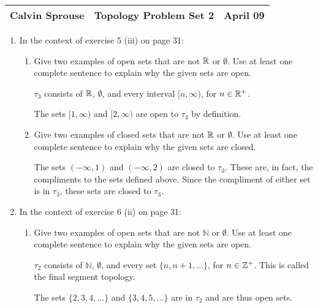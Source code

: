 \documentclass[a4paper, 12pt]{config/homework}
\begin{document}
\noindent
\begin{tabularx}{\textwidth}{>{\centering\arraybackslash}X>{\centering\arraybackslash}X>{\centering\arraybackslash}X}
Calvin Sprouse & Topology Problem Set 2 & 2024 April 09\\
\midrule
\end{tabularx}

\vspace{\baselineskip}
\begin{enumerate}
\item In the context of exercise 5 (iii) on page 31:
\begin{enumerate}[label=\alph*.]
\item Give two examples of open sets that are not \(\mathbb{R}\) or \(\emptyset\). Use at least one complete sentence to explain why the given sets are open.

\(\tau_3\) consists of \(\mathbb{R}\), \(\emptyset\), and every interval \([n,\infty)\), for \(n\in\mathbb{R}^+\).

The sets \([1,\infty)\) and \([2,\infty)\) are open to \(\tau_3\) by definition.

\bigskip
\item Give two examples of closed sets that are not \(\mathbb{R}\) or \(\emptyset\). Use at least one complete sentence to explain why the given sets are closed.

The sets \((-\infty,1)\) and \((-\infty,2)\) are closed to \(\tau_3\). These are, in fact, the compliments to the sets defined above. Since the compliment of either set is in \(\tau_3\), these sets are closed to \(\tau_3\).

\end{enumerate}
\bigskip
\item In the context of exercise 6 (ii) on page 31:
\begin{enumerate}[label=\alph*.]
\item Give two examples of open sets that are not \(\mathbb{N}\) or \(\emptyset\). Use at least one complete sentence to explain why the given sets are open.

\(\tau_2\) consists of \(\mathbb{N}\), \(\emptyset\), and every set \(\{n, n+1, \dots\}\), for \(n\in\mathbb{Z}^+\). This is called the final segment topology.

The sets \(\{2, 3, 4, \dots\}\) and \(\{3, 4, 5, \dots\}\) are in \(\tau_2\) and are thus open sets.


\end{enumerate}
\end{enumerate}
\end{document}
